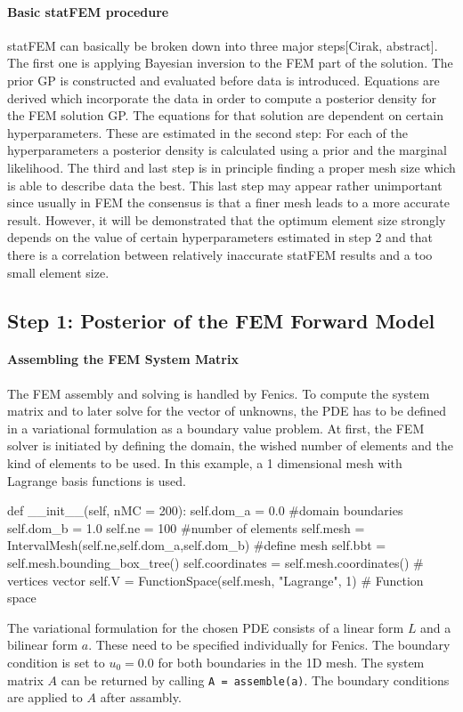 \documentclass[%
  a4paper,oneside,%
  11pt,%
  smallchapters,
  green,%
  rgb, <cmyk>
  ,]{tubsbook}
\begin{document}
\paragraph{Basic statFEM procedure}
statFEM can basically be broken down into three major steps[Cirak, abstract]. The first one is applying Bayesian inversion to the FEM part of the solution. The prior GP is constructed and evaluated before data is introduced. Equations are derived which incorporate the data in order to compute a posterior density for the FEM solution GP. The equations for that solution are dependent on certain hyperparameters. These are estimated in the second step: For each of the hyperparameters a posterior density is calculated using a prior and the marginal likelihood. The third and last step is in principle finding a proper mesh size which is able to describe data the best. This last step may appear rather unimportant since usually in FEM the consensus is that a finer mesh leads to a more accurate result. However, it will be demonstrated that the optimum element size strongly depends on the value of certain hyperparameters estimated in step 2 and that there is a correlation between relatively inaccurate statFEM results and a too small element size.

\subsection{Step 1: Posterior of the FEM Forward Model}

\paragraph{Assembling the FEM System Matrix}
The FEM assembly and solving is handled by Fenics. To compute the system matrix and to later solve for the vector of unknowns, the PDE has to be defined in a variational formulation as a boundary value problem.
At first, the FEM solver is initiated by defining the domain, the wished number of elements and the kind of elements to be used. In this example, a 1 dimensional mesh with Lagrange basis functions is used.
\begin{python}
def __init__(self, nMC = 200):
	self.dom_a = 0.0 #domain boundaries
	self.dom_b = 1.0
	self.ne	= 100 #number of elements
	self.mesh = IntervalMesh(self.ne,self.dom_a,self.dom_b) #define mesh
	self.bbt = self.mesh.bounding_box_tree()
	self.coordinates = self.mesh.coordinates() # vertices vector
	self.V = FunctionSpace(self.mesh, "Lagrange", 1) # Function space
\end{python}
The variational formulation for the chosen PDE consists of a linear form $L$ and a bilinear form $a$. These need to be specified individually for Fenics. The boundary condition is set to $u_0 = 0.0$ for both boundaries in the 1D mesh. The system matrix $A$ can be returned by calling \texttt{A = assemble(a)}. The boundary conditions are applied to $A$ after assambly.
\end{document}
